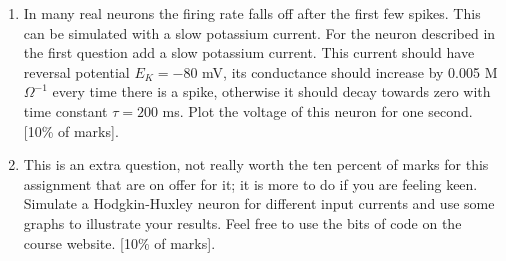\documentclass[11pt,a4paper]{scrartcl}
\begin{document}
\begin{enumerate}
\item In many real neurons the firing rate falls off after the first few spikes. This can be simulated with a slow potassium current. For the neuron described in the first question add a slow potassium current. This current should have reversal potential $E_K=-80$ mV, its conductance should increase by 0.005 M$\Omega^{-1}$ every time there is a spike, otherwise it should decay towards zero with time constant $\tau=200$ ms. Plot the voltage of this neuron for one second. [10\% of marks].

\item This is an extra question, not really worth the ten percent of
  marks for this assignment that are on offer for it; it is more to do
  if you are feeling keen. Simulate a Hodgkin-Huxley neuron for
  different input currents and use some graphs to illustrate your
  results. Feel free to use the bits of code on the course
  website. [10\% of marks].

\end{enumerate}
\end{document}
